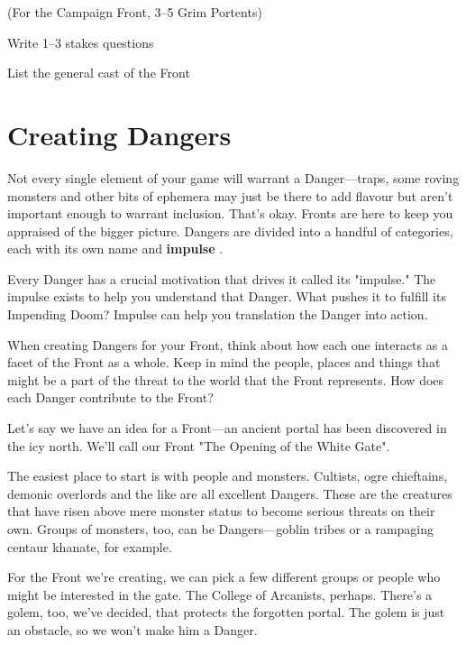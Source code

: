          
\item (For the Campaign Front, 3–5 Grim Portents)

         
\item Write 1–3 stakes questions

         
\item List the general cast of the Front

       
\stopitemize
       
\section{Creating Dangers}   
       

Not every single element of your game will warrant a Danger—traps, some roving monsters and other bits of ephemera may just be there to add flavour but aren't important enough to warrant inclusion. That’s okay. Fronts are here to keep you appraised of the bigger picture. Dangers are divided into a handful of categories, each with its own name and {\bf impulse} .

       

Every Danger has a crucial motivation that drives it called its "impulse." The impulse exists to help you understand that Danger. What pushes it to fulfill its Impending Doom? Impulse can help you translation the Danger into action.

       

When creating Dangers for your Front, think about how each one interacts as a facet of the Front as a whole. Keep in mind the people, places and things that might be a part of the threat to the world that the Front represents. How does each Danger contribute to the Front?

       
\startExample
Let's say we have an idea for a Front—an ancient portal has been discovered in the icy north. We'll call our Front "The Opening of the White Gate".
\stopExample
       

The easiest place to start is with people and monsters. Cultists, ogre chieftains, demonic overlords and the like are all excellent Dangers. These are the creatures that have risen above mere monster status to become serious threats on their own. Groups of monsters, too, can be Dangers—goblin tribes or a rampaging centaur khanate, for example.

       
\startExample
For the Front we're creating, we can pick a few different groups or people who might be interested in the gate. The College of Arcanists, perhaps. There's a golem, too, we've decided, that protects the forgotten portal. The golem is just an obstacle, so we won't make him a Danger.
\stopExample
       

